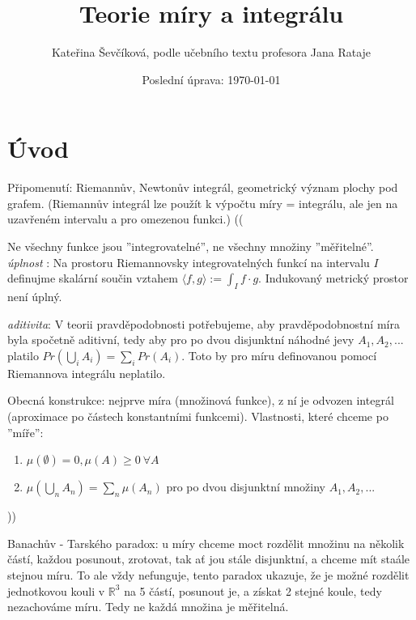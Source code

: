 \documentclass{article}
\title{Teorie míry a integrálu}
\author{Kateřina Ševčíková, podle učebního textu profesora Jana Rataje}
\date{Poslední úprava: \today}
\theoremstyle{definition}
\theoremstyle{definition}
\theoremstyle{definition}
\begin{document}
\maketitle

\tableofcontents
\newpage

\section*{Úvod}
Připomenutí: Riemannův, Newtonův integrál, geometrický význam plochy pod
grafem. (Riemannův integrál lze použít k výpočtu míry = integrálu, ale jen na 
uzavřeném intervalu a pro omezenou funkci.)
(( 

Ne všechny funkce jsou ”integrovatelné”, ne všechny množiny ”měřitelné”. \\
\textit{úplnost} :  Na  prostoru  Riemannovsky  integrovatelných  funkcí  na  intervalu  \(I\) 
definujme skalární součin vztahem   \( \langle f, g\rangle    :=   \int _I  f \cdot g \). 
Indukovaný metrický prostor není úplný.

\textit{aditivita}: V teorii pravděpodobnosti potřebujeme, aby pravděpodobnostní míra  
byla  spočetně aditivní,  tedy  aby  pro  po  dvou  disjunktní  náhodné jevy \(A_1, A_2, . . .\) 
platilo \(Pr(\bigcup _i A_i) = \sum_i Pr(A_i)\).
Toto by pro míru definovanou pomocí Riemannova integrálu neplatilo.

Obecná konstrukce: nejprve  míra (množinová  funkce), z ní  je  odvozen  integrál (aproximace po částech konstantními funkcemi).
Vlastnosti, které chceme po ”míře”:
\begin{enumerate}
    \item \( \mu (\emptyset) = 0, \mu(A) \geq 0 \ \forall A \)
    \item \(\mu(\bigcup _n A_n) = \sum _n \mu(A_n)\) pro po dvou disjunktní množiny \(A_1, A_2, ... \)
\end{enumerate}

 ))

Banachův - Tarského paradox: u míry chceme moct rozdělit množinu na několik částí, 
každou posunout, zrotovat, tak ať jou stále disjunktní, a chceme mít staále stejnou míru.
To ale vždy nefunguje, tento paradox ukazuje, že je možné rozdělit jednotkovou kouli v \(\mathbb{R}^3\) 
na 5 částí, posunout je, a získat 2 stejné koule, tedy nezachováme míru.
Tedy ne každá množina je měřitelná.
\end{document}
